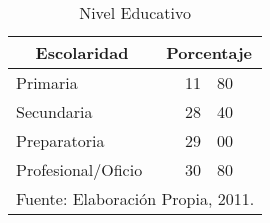 \begin{table}[h!]
    \caption{Nivel Educativo}
    \label{tbl:Encuesta:NivelEducativo}
    \centering
    \begin{tabular}{l|r@{.}l@{\%}}
	    \multicolumn{1}{c|}{Escolaridad} &
	    	\multicolumn{2}{c}{Porcentaje} \\
	    \hline
	    \hline
	    Primaria           & 11 & 80 \\
	    Secundaria         & 28 & 40 \\
	    Preparatoria       & 29 & 00 \\
	    Profesional/Oficio & 30 & 80 \\
	    \hline
	    \multicolumn{3}{l}{\footnotesize Fuente: Elaboración Propia, 2011.}
    \end{tabular}
\end{table}
